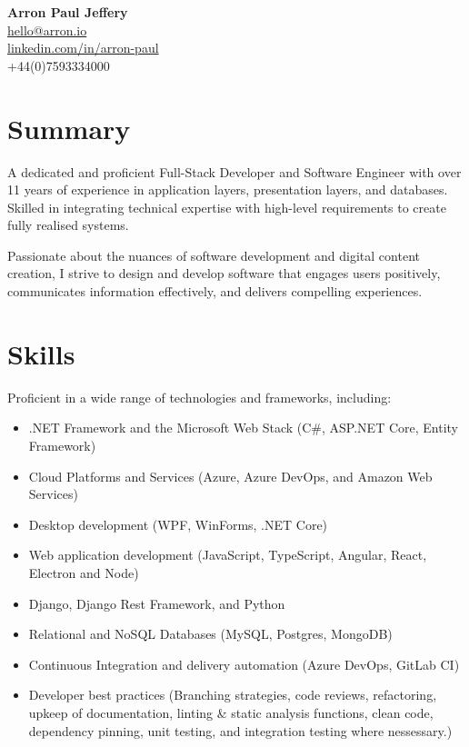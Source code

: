\documentclass{article}
\begin{document}
\begin{center}
    \textbf{\Large Arron Paul Jeffery} \\
    \href{mailto:hello@arron.io}{hello@arron.io} \\
    \href{https://linkedin.com/in/arron-paul}{linkedin.com/in/arron-paul} \\
    +44(0)7593334000
\end{center}

\section*{Summary}

A dedicated and proficient Full-Stack Developer and Software Engineer with over 11 years of experience in application layers, presentation layers, and databases. Skilled in integrating technical expertise with high-level requirements to create fully realised systems.

Passionate about the nuances of software development and digital content creation, I strive to design and develop software that engages users positively, communicates information effectively, and delivers compelling experiences.

\section*{Skills}

Proficient in a wide range of technologies and frameworks, including:

\begin{itemize}
    \item .NET Framework and the Microsoft Web Stack (C\#, ASP.NET Core, Entity Framework)
    \item Cloud Platforms and Services (Azure, Azure DevOps, and Amazon Web Services)
    \item Desktop development (WPF, WinForms, .NET Core)
    \item Web application development (JavaScript, TypeScript, Angular, React, Electron and Node)
    \item Django, Django Rest Framework, and Python
    \item Relational and NoSQL Databases (MySQL, Postgres, MongoDB)
    \item Continuous Integration and delivery automation (Azure DevOps, GitLab CI)
    \item Developer best practices (Branching strategies, code reviews, refactoring, upkeep of documentation, linting \& static analysis functions, clean code, dependency pinning, unit testing, and integration testing where nessessary.)
\end{itemize}
\end{document}
